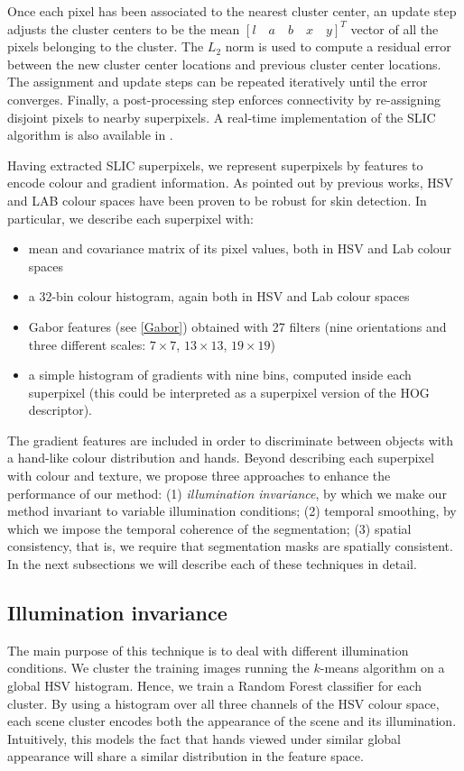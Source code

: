 Once each pixel has been associated to the nearest cluster center, an update step adjusts the cluster centers to be the mean
$[l \quad a \quad b \quad x \quad y]^T$ vector of all the pixels belonging to the cluster. The $L_2$ norm is used to compute a residual error  between
the new cluster center locations and previous cluster center locations. The assignment and update steps can be repeated
iteratively until the error converges. Finally, a post-processing step enforces connectivity by re-assigning disjoint pixels to
nearby superpixels. A real-time implementation of the SLIC algorithm is also available in \cite{YHRengSLIC}.

Having extracted SLIC superpixels, we represent superpixels by features to encode colour and gradient information. As pointed out by previous works, HSV and LAB colour spaces have been proven to be robust for skin detection. 
In particular, we describe each superpixel with:
\begin{itemize} 
\item mean and covariance matrix of its pixel values, both in HSV and Lab colour spaces
\item a 32-bin colour histogram, again both in HSV and Lab colour spaces
\item Gabor features (see \ref{Gabor}) obtained with 27 filters (nine orientations and three different scales: $7 \times 7$, $13 \times 13$, $19 \times 19$) 
\item a simple histogram of gradients with nine bins, computed inside each superpixel (this could be interpreted as a superpixel version of the HOG descriptor). 
\end{itemize}

The gradient features are included in order to discriminate between objects with a hand-like colour distribution and hands. Beyond describing each superpixel with colour and texture, we propose three approaches to enhance the performance of our method: (1) \textit{illumination invariance}, by which we make our method invariant to variable illumination conditions; (2) temporal smoothing, by which we impose the temporal coherence of the segmentation; (3) spatial consistency, that is, we require that segmentation masks are spatially consistent. In the next subsections we will describe each of these techniques in detail.

\subsection{Illumination invariance}
The main purpose of this technique is to deal with different illumination conditions. We cluster the training images running the $k$-means algorithm on a global HSV histogram. Hence, we train a Random Forest classifier for each cluster. By using a histogram over all three channels of the HSV colour space, each scene cluster encodes both the appearance of the scene and its illumination. Intuitively, this models the fact that hands viewed under similar global appearance will share a similar distribution in the feature space. 


